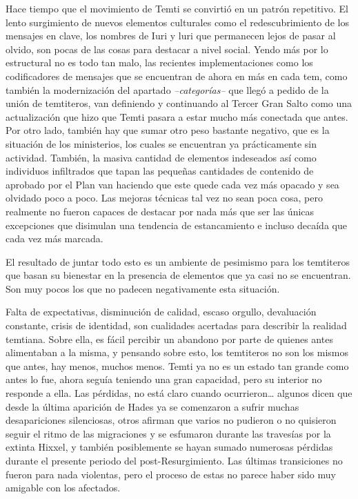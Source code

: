 \documentclass[
  spanish,
]{book}
\begin{document}
Hace tiempo que el movimiento de Temti se convirtió en un patrón repetitivo.
El lento surgimiento de nuevos elementos culturales como el redescubrimiento de los mensajes en clave, los nombres de Iuri y luri que permanecen lejos de pasar al olvido, son pocas de las cosas para destacar a nivel social. Yendo más por lo estructural no es todo tan malo, las recientes implementaciones como los codificadores de mensajes que se encuentran de ahora en más en cada tem, como también la modernización del apartado \emph{--categorías--} que llegó a pedido de la unión de temtiteros, van definiendo y continuando al Tercer Gran Salto como una actualización que hizo que Temti pasara a estar mucho más conectada que antes. Por otro lado, también hay que sumar otro peso bastante negativo, que es la situación de los ministerios, los cuales se encuentran ya prácticamente sin actividad. También, la masiva cantidad de elementos indeseados así como individuos infiltrados que tapan las pequeñas cantidades de contenido de aprobado por el Plan van haciendo que este quede cada vez más opacado y sea olvidado poco a poco.
Las mejoras técnicas tal vez no sean poca cosa, pero realmente no fueron capaces de destacar por nada más que ser las únicas excepciones que disimulan una tendencia de estancamiento e incluso decaída que cada vez más marcada.

El resultado de juntar todo esto es un ambiente de pesimismo para los temtiteros que basan su bienestar en la presencia de elementos que ya casi no se encuentran. Son muy pocos los que no padecen negativamente esta situación.

Falta de expectativas, disminución de calidad, escaso orgullo, devaluación constante, crisis de identidad, son cualidades acertadas para describir la realidad temtiana. Sobre ella, es fácil percibir un abandono por parte de quienes antes alimentaban a la misma, y pensando sobre esto, los temtiteros no son los mismos que antes, hay menos, muchos menos. Temti ya no es un estado tan grande como antes lo fue, ahora seguía teniendo una gran capacidad, pero su interior no responde a ella.
Las pérdidas, no está claro cuando ocurrieron\ldots{} algunos dicen que desde la última aparición de Hades ya se comenzaron a sufrir muchas desapariciones silenciosas, otros afirman que varios no pudieron o no quisieron seguir el ritmo de las migraciones y se esfumaron durante las travesías por la extinta Hixxel, y también posiblemente se hayan sumado numerosas pérdidas durante el presente periodo del post-Resurgimiento. Las últimas transiciones no fueron para nada violentas, pero el proceso de estas no parece haber sido muy amigable con los afectados.
\end{document}
